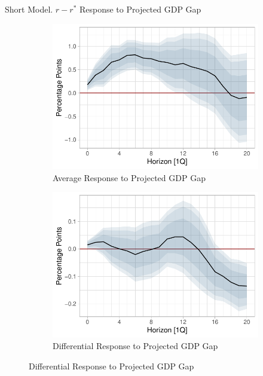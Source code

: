 \documentclass[10pt,aspectratio=169]{beamer}
\begin{document}
\begin{frame}{Short Model. $r-r^*$ Response to Projected GDP Gap}

    \begin{figure}[!htbp]\centering
        \begin{minipage}{1\textwidth}
            \caption{}
          \begin{subfigure}[b]{0.495\textwidth}
              \centering
              \caption{Average Response to Projected GDP Gap}
              \label{fig:LP_short:average_gap}
              \includegraphics[width=\linewidth]{average_gap_short.pdf}
          \end{subfigure}%
          \begin{subfigure}[b]{0.495\textwidth}
              \centering
              \caption{Differential Response to Projected GDP Gap}
              \label{fig:LP_short:differential_gap}
              \includegraphics[width=\linewidth]{differential_gap_short.pdf}

\end{subfigure}
\end{minipage}
\end{figure}
\end{frame}
\end{document}
